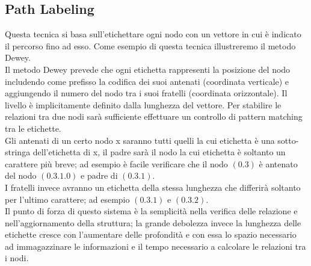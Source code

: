\subsection{Path Labeling}
Questa tecnica si basa sull'etichettare ogni nodo con un vettore in cui è indicato il percorso fino ad esso. Come esempio di questa tecnica illustreremo il metodo Dewey.
\\
Il metodo Dewey prevede che ogni etichetta rappresenti la posizione del nodo includendo come prefisso la codifica dei suoi antenati (coordinata verticale) e aggiungendo il numero del nodo tra i suoi fratelli (coordinata orizzontale). Il livello è implicitamente definito dalla lunghezza del vettore.
Per stabilire le relazioni tra due nodi sarà sufficiente effettuare un controllo di pattern matching tra le etichette.
\\
Gli antenati di un certo nodo x saranno tutti quelli la cui etichetta è una sotto-stringa dell'etichetta di x, il padre sarà il nodo la cui etichetta è soltanto un carattere più breve; ad esempio è facile verificare che il nodo $(0.3)$ è antenato del nodo $(0.3.1.0)$ e padre di $(0.3.1)$.
\\
I fratelli invece avranno un etichetta della stessa lunghezza che differirà soltanto per l'ultimo carattere; ad esempio $(0.3.1)$ e $(0.3.2)$.
\\
Il punto di forza di questo sistema è la semplicità nella verifica delle relazione e nell'aggiornamento della struttura; la grande debolezza invece la lunghezza delle etichette cresce con l'aumentare delle profondità e con essa lo spazio necessario ad immagazzinare le informazioni e il tempo necessario a calcolare le relazioni tra i nodi.

